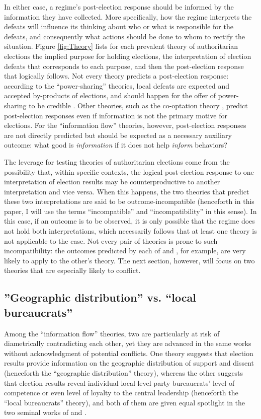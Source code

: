 \documentclass[12pt]{article}\usepackage[]{graphicx}\usepackage[]{color}
\newcommand{\1}{\mathbbm{1}}
\begin{document}
In either case, a regime's post-election response should be informed by the information they have collected. More specifically, how the regime interprets the defeats will influence its thinking about who or what is responsible for the defeats, and consequently what actions should be done to whom to rectify the situation. Figure \ref{fig:Theory} lists for each prevalent theory of authoritarian elections the implied purpose for holding elections, the interpretation of election defeats that corresponds to each purpose, and then the post-election response that logically follows. Not every theory predicts a post-election response: according to the ``power-sharing'' theories, local defeats are expected and accepted by-products of elections, and should happen for the offer of power-sharing to be credible \citep{AR2005, Cox2009}. Other theories, such as the co-optation theory \citep{LustOkar2005}, predict post-election responses even if information is not the primary motive for elections. For the ``information flow'' theories, however, post-election responses are not directly predicted but should be expected as a necessary auxiliary outcome: what good is \textit{information} if it does not help \textit{inform} behaviors?

The leverage for testing theories of authoritarian elections come from the possibility that, within specific contexts, the logical post-election response to one interpretation of election results may be counterproductive to another interpretation and vice versa. When this happens, the two theories that predict these two interpretations are said to be outcome-incompatible (henceforth in this paper, I will use the terms ``incompatible'' and ``incompatibility'' in this sense). In this case, if an outcome is to be observed, it is only possible that the regime does not hold both interpretations, which necessarily follows that at least one theory is not applicable to the case. Not every pair of theories is prone to such incompatibility: the outcomes predicted by each of \cite{Miller2015} and \cite{Geddes2005}, for example, are very likely to apply to the other's theory. The next section, however, will focus on two theories that are especially likely to conflict.

\subsection{''Geographic distribution'' vs. ``local bureaucrats''}
Among the ``information flow'' theories, two are particularly at risk of diametrically contradicting each other, yet they are advanced in the same works without acknowledgment of potential conflicts. One theory suggests that election results provide information on the geographic distribution of support and dissent (henceforth the ``geographic distribution'' theory), whereas the other suggests that election results reveal individual local level party bureaucrats' level of competence or even level of loyalty to the central leadership (henceforth the ``local bureaucrats'' theory), and both of them are given equal spotlight in the two seminal works of \cite{Magaloni2006} and \cite{Blaydes2008}. 
\end{document}
